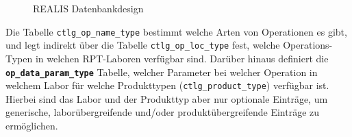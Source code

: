 \begin{figure}[!htbp]
    \centering
    \caption{REALIS Datenbankdesign}
    \label{fig:realis-datenbankdesign}
\end{figure}

Die Tabelle \texttt{ctlg\_op\_name\_type} bestimmt welche Arten von Operationen es gibt, und legt indirekt über die Tabelle \texttt{ctlg\_op\_loc\_type} fest, welche Operations-Typen in welchen \gls{RPT}-Laboren verfügbar sind. Darüber hinaus definiert die 
\textbf{\texttt{op\_data\_\-param\_type}} Tabelle, welcher Parameter bei welcher Operation in welchem Labor für welche Produkttypen (\texttt{ctlg\_product\_type}) verfügbar ist. Hierbei sind das Labor und der Produkttyp aber nur optionale Einträge, um generische, laborübergreifende und/oder produktübergreifende Einträge zu ermöglichen.

